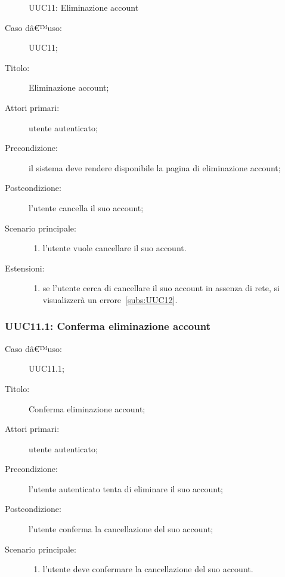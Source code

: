 \documentclass[../../../analisi-dei-requisiti.tex]{subfiles}
\begin{document}
\begin{figure}[H]
  \centering
  \caption{UUC11: Eliminazione account}%
  \label{fig:UUC11}
\end{figure}

\begin{description}
  \item[Caso dâ€™uso:] UUC11;
  \item[Titolo:] Eliminazione account;
  \item[Attori primari:] utente autenticato;
  \item[Precondizione:] il sistema deve rendere disponibile la pagina di eliminazione account;
  \item[Postcondizione:] l'utente cancella il suo account;
  \item[Scenario principale:]
        \begin{enumerate}
          \item l'utente vuole cancellare il suo account.
        \end{enumerate}
        \item[Estensioni:]
        \begin{enumerate}
          \item se l'utente cerca di cancellare il suo account in assenza di rete, si visualizzerà un errore~\ref{subs:UUC12}.
        \end{enumerate}
\end{description}

\subsubsection{UUC11.1: Conferma eliminazione account}%
\label{subs:UUC11.1}

\begin{description}
  \item[Caso dâ€™uso:] UUC11.1;
  \item[Titolo:] Conferma eliminazione account;
  \item[Attori primari:] utente autenticato;
  \item[Precondizione:] l'utente autenticato tenta di eliminare il suo account;
  \item[Postcondizione:] l'utente conferma la cancellazione del suo account;
  \item[Scenario principale:]
        \begin{enumerate}
          \item l'utente deve confermare la cancellazione del suo account.
        \end{enumerate}
\end{description}
\end{document}
